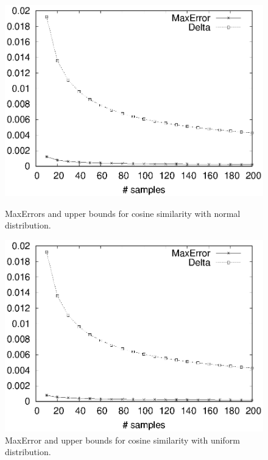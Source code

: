 \documentclass{article}
\begin{document}
\begin{figure}[!t]
\centering
\begin{minipage}{.45\textwidth}
\centering
\includegraphics[width=.9\textwidth]{cos_normal_apprx_error.eps}
\caption{\textsf{MaxError}s and upper bounds for cosine similarity with normal distribution.}
\label{fig:cnae}
\end{minipage}
\hspace{1cm}
\begin{minipage}{.45\textwidth}
\centering
\includegraphics[width=.9\textwidth]{cos_uniform_apprx_error.eps}
\caption{\textsf{MaxError} and upper bounds for cosine similarity with uniform distribution.}
\label{fig:cuae}
\end{minipage}
\end{figure}
\end{document}
